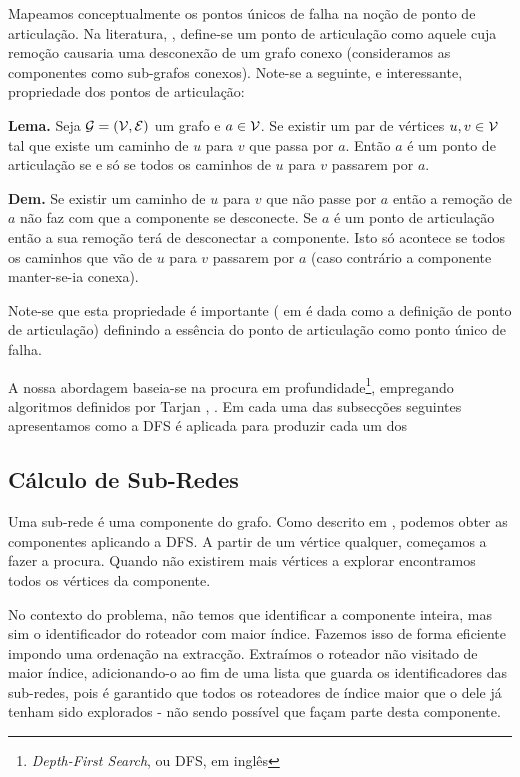 \documentclass[a4paper, 12pt, conference]{ieeeconf}
\begin{document}
Mapeamos conceptualmente os pontos únicos de falha na noção de ponto de
articulação. Na literatura, \cite{cormen}, define-se um ponto de articulação como
aquele cuja remoção causaria uma desconexão de um grafo conexo (consideramos as
componentes como sub-grafos conexos). Note-se a seguinte, e interessante,
propriedade dos pontos de articulação:

\textbf{Lema.} Seja ${\cal G} = ({\cal V}, {\cal E})$ um grafo e $a \in {\cal
V}$. Se existir um par
de vértices $u, v \in {\cal V}$ tal que existe um caminho de $u$ para $v$ que passa por
$a$. Então $a$ é um ponto de
articulação se e só se todos os caminhos de $u$ para $v$ passarem por $a$.

\textbf{Dem.} Se existir um caminho de $u$ para $v$ que não passe por $a$ então
a remoção de $a$ não faz com que a componente se desconecte. Se $a$ é um ponto
de articulação então a sua remoção terá de desconectar a componente. Isto só
acontece se todos os caminhos que vão de $u$ para $v$ passarem por $a$ (caso
contrário a componente manter-se-ia conexa).

Note-se que esta propriedade é importante ( em \cite{tarjan1} é dada como a
definição de ponto de articulação) definindo a essência do ponto de
articulação como ponto único de falha.

A nossa abordagem baseia-se na procura em
profundidade\footnote{\textit{Depth-First Search}, ou DFS, em inglês}, empregando algoritmos
definidos por Tarjan \cite{tarjan1}, \cite{tarjan2}. Em cada uma das subsecções
seguintes apresentamos como a DFS é aplicada para produzir cada um dos

\subsection{Cálculo de Sub-Redes}
Uma sub-rede é uma componente do grafo. Como descrito em \cite{tarjan2}, podemos
obter as componentes aplicando a DFS. A partir de um vértice qualquer, começamos
a fazer a procura. Quando não existirem mais vértices a
explorar encontramos todos os vértices da componente.

No contexto do problema, não temos que
identificar a componente inteira, mas sim o identificador do roteador com maior
índice.  Fazemos isso de forma eficiente impondo uma ordenação na extracção.
Extraímos o roteador não visitado de maior índice, adicionando-o ao fim de uma
lista que guarda os identificadores das sub-redes, pois é garantido que todos os
roteadores de índice maior que o dele já tenham sido explorados - não sendo
possível que façam parte desta componente.
\end{document}
